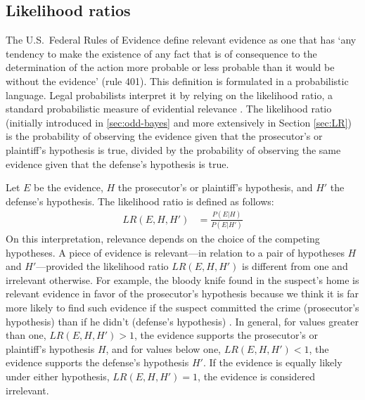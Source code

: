 \documentclass{article}
\begin{document}

\subsection{Likelihood ratios}

The U.S.\ Federal Rules of Evidence
define relevant evidence as one that has `any tendency to make the existence of any fact that is of consequence to the determination of the action more probable or less probable than it would be without the evidence' (rule 401). 
This definition is formulated in a probabilistic language.
Legal probabilists interpret it by relying on the likelihood ratio, a standard probabilistic measure of 
evidential relevance \citep{lempert1977modeling,lyon1996relevance,aitken2004statistics, aitken2010fundamentals,sullivan2016LikelihoodStoryTheory}.
The likelihood ratio (initially introduced in \ref{sec:odd-bayes} and more extensively in Section \ref{sec:LR}) is the probability of observing the evidence given that the prosecutor's or plaintiff's hypothesis is true,  divided by the probability of observing the same evidence given that the defense's hypothesis is true. 

Let $E$ be the evidence, $H$ the prosecutor's or plaintiff's hypothesis, and $H'$ the defense's hypothesis. The likelihood ratio 
is defined as follows:
%
\begin{align*}LR(E,H,H') & = \frac{P(E\vert H)}{P(E\vert H')}\end{align*}
%
On this interpretation, relevance depends on the choice of the competing hypotheses. 
%
A piece of evidence is relevant---in relation to a pair of hypotheses $H$ and $H'$---provided the likelihood ratio  $LR(E, H, H')$ 
is different from one and irrelevant otherwise. For example, 
the bloody knife found in the suspect's home is relevant  evidence in favor of the prosecutor's hypothesis because we think it is far more likely to find such evidence if the suspect committed the crime (prosecutor's hypothesis) than if he didn't (defense's hypothesis) %
\citep{finkelstein2009basic}. In general, 
for values greater than one, $LR(E, H, H')>1$, the evidence supports the prosecutor's or plaintiff's hypothesis $H$, and for values below one, $LR(E, H, H')<1$, the evidence supports the defense's hypothesis $H'$.
If the evidence is equally likely under either hypothesis,
$LR(E, H, H')=1$, the evidence is considered irrelevant. 
\end{document}
